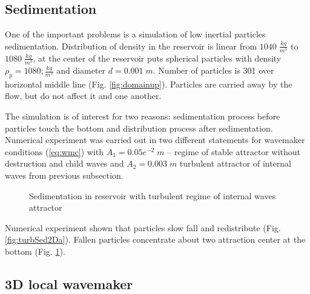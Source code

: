 \documentclass[a4wide,fontsize=12pt]{article}
\begin{document}
\subsection{Sedimentation}

One of the important problems is a simulation of low inertial particles sedimentation. Distribution of density in  the reservoir is linear from $1040\;\frac{kg}{m^3}$ to $1080\;\frac{kg}{m^3}$, at the center of the reservoir puts spherical particles with density $\rho_p = 1080;\frac{kg}{m^3}$ and diameter $d=0.001 \; m$.  Number of particles is 301 over horizontal middle line (Fig. \ref{fig:domainup}). Particles are carried away by the flow, but do not affect it and one another.

The simulation is of interest for two reasons: sedimentation process before particles touch the bottom and distribution process after sedimentation. Numerical experiment was carried out in two different statements for wavemaker conditions (\ref{eq:wmc}) with $A_1=0.05e^{-2}\;m$ -- regime of stable attractor without destruction and child waves and $A_2=0.003\;m$ turbulent attractor of internal waves from previous subsection. 

\begin{figure}
\centering
    \begin{minipage}{0.45\textwidth}
        \centering
        \label{fig:turbSed2Da}
    \end{minipage}
    \begin{minipage}{0.45\textwidth}
        \centering
        \label{fig:turbSed2Db}
    \end{minipage}
    \caption{Sedimentation in reservoir with turbulent regime of internal waves attractor}
\end{figure}

Numerical experiment shown that particles slow fall and redistribute (Fig. \ref{fig:turbSed2Da}). Fallen particles concentrate about two attraction center at the bottom (Fig. \ref{fig:turbSed2Db}).

\subsection{3D local wavemaker}
\end{document}
